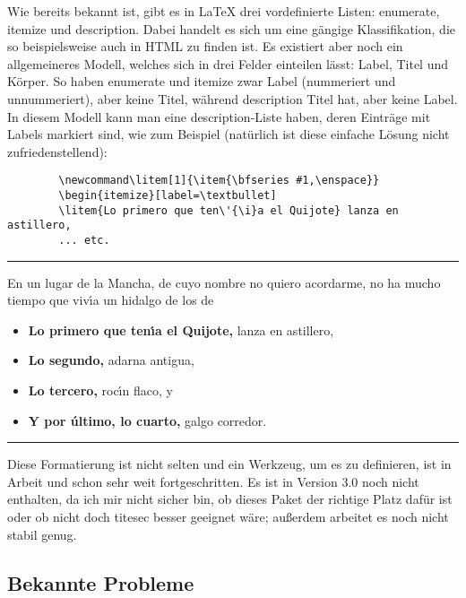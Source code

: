 \documentclass[a4paper,ngerman]{ltxguide}
\newcommand\0{\unskip\enspace\fbox{\fontsize{4}{4}\selectfont NEU 3.0}}
\newcommand\3{\unskip\enspace\fbox{\fontsize{4}{4}\selectfont NEW 3.0}}
\begin{document}
\begin{enumerate}[leftmargin=*]
\begin{enumerate}[leftmargin=\parindent]
\begin{enumerate}[labelindent=\parindent,|\allowbreak
| leftmargin=*,|\allowbreak| label=\Roman*.,|\allowbreak
| widest=IV,|\allowbreak| align=left]
\begin{enumerate}[label=\fbox{\arabic*}]
Wie bereits bekannt ist, gibt es in \LaTeX{} drei vordefinierte Listen: \textsf{enumerate}, \textsf{itemize} und 
\textsf{description}. Dabei handelt es sich um eine g\"angige Klassifikation, die so beispielsweise auch in HTML zu 
finden ist. Es existiert aber noch ein allgemeineres Modell, welches sich
in drei Felder einteilen l\"asst: Label, Titel
und K\"orper. So haben \textsf{enumerate} und \textsf{itemize} zwar Label (nummeriert und unnummeriert), aber keine 
Titel, w\"ahrend \textsf{description} Titel hat, aber keine Label. In diesem Modell kann man eine 
\textsf{description}-Liste haben, deren Eintr\"age mit Labels markiert sind, wie zum Beispiel (nat\"urlich ist diese 
einfache L\"osung nicht zufriedenstellend):

	\begin{verbatim}
		\newcommand\litem[1]{\item{\bfseries #1,\enspace}}
		\begin{itemize}[label=\textbullet]
		\litem{Lo primero que ten\'{\i}a el Quijote} lanza en astillero,
		... etc.
	\end{verbatim}

\newpage

\vskip6pt
\goodbreak
\hrule
\vskip6pt

\newcommand\litem[1]{\item{\bfseries #1,\enspace}}
En un lugar de la Mancha, de cuyo nombre no quiero acordarme,
no ha mucho tiempo que viv\'{\i}a un hidalgo de los de
\begin{itemize}[label=\textbullet]
\litem{Lo primero que ten\'{\i}a el Quijote} lanza en astillero,
\litem{Lo segundo} adarna antigua,
\litem{Lo tercero} roc\'{\i}n flaco, y
\litem{Y por \'{u}ltimo, lo cuarto} galgo corredor.
\end{itemize}

\vskip6pt
\goodbreak
\hrule
\vskip6pt

Diese Formatierung ist nicht selten und ein Werkzeug, um es zu definieren, ist in Arbeit und schon sehr weit 
fortgeschritten. Es ist in Version 3.0 noch nicht enthalten, da ich mir nicht sicher bin, ob dieses Paket der 
richtige Platz daf\"ur ist oder ob nicht doch \textsf{titesec} besser
geeignet w\"are; au\ss erdem arbeitet es noch nicht stabil genug.

	
	\subsection{Bekannte Probleme}
	
\end{enumerate}
\end{enumerate}
\end{enumerate}
\end{enumerate}
\end{document}

